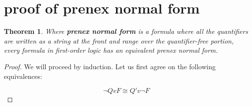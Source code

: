 \documentclass[a4paper,11pt]{article}
\newtheorem{thm}{Theorem}[section]
\begin{document}
\section{proof of prenex normal form}

\begin{thm} Where \textbf{prenex normal form} is a formula where all the quantifiers are written as a string at the front and range over the quantifier-free portion, every formula in first-order logic has an equivalent prenex normal form. \end{thm}

	
	\begin{proof}
		We will proceed by induction. Let us first agree on the following equivalences:
		
		\begin{equation} \lnot Qv F \cong Q'v \lnot F \end{equation}
	\end{proof}
	
\end{document}
